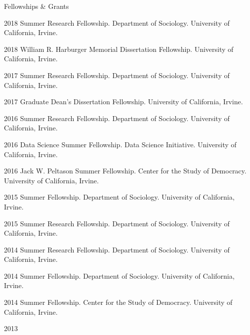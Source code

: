 \begin{rSection}{Fellowships \& Grants}
\begin{hangt}{2018 \datefill}
Summer Research Fellowship. Department of Sociology. University of California, Irvine. %
\end{hangt}
\begin{hangt}{2018 \datefill}
William R. Harburger Memorial Dissertation Fellowship. University of California, Irvine. %
\end{hangt}
\begin{hangt}{2017 \datefill}
Summer Research Fellowship. Department of Sociology. University of California, Irvine. %
\end{hangt}
\begin{hangt}{2017 \datefill}
Graduate Dean's Dissertation Fellowship. University of California, Irvine. %
\end{hangt}
\begin{hangt}{2016 \datefill}
Summer Research Fellowship. Department of Sociology. University of California, Irvine. %
\end{hangt}
\begin{hangt}{2016 \datefill}
Data Science Summer Fellowship. Data Science Initiative. University of California, Irvine. %
\end{hangt}
\begin{hangt}{2016 \datefill}
Jack W. Peltason Summer Fellowship. Center for the Study of Democracy. University of California, Irvine. %
\end{hangt}
\begin{hangt}{2015 \datefill}
Summer Fellowship. Department of Sociology. University of California, Irvine. %
\end{hangt}
\begin{hangt}{2015 \datefill}
Summer Research Fellowship. Department of Sociology. University of California, Irvine. %
\end{hangt}
\begin{hangt}{2014 \datefill}
Summer Research Fellowship. Department of Sociology. University of California, Irvine. %
\end{hangt}
\begin{hangt}{2014 \datefill}
Summer Fellowship. Department of Sociology. University of California, Irvine. %
\end{hangt}
\begin{hangt}{2014 \datefill}
Summer Fellowship. Center for the Study of Democracy. University of California, Irvine. %
\end{hangt}
\begin{hangt}{2013 \datefill}

\end{hangt}
\end{rSection}
